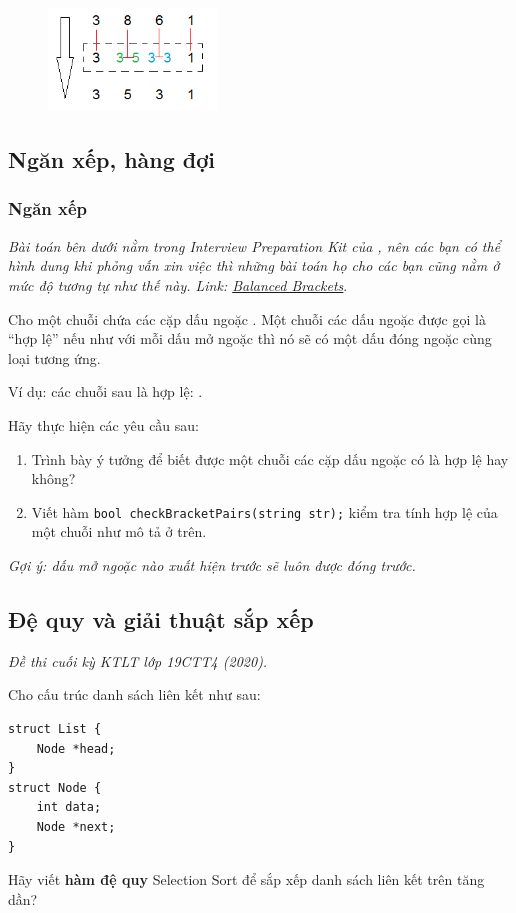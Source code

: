\documentclass[main.tex]{subfiles}
\begin{document}
\begin{figure}[H]
\centering
\includegraphics[width=0.4\textwidth]{image/q_DSLK.png}
\end{figure}
\subsection{Ngăn xếp, hàng đợi}
\subsubsection{Ngăn xếp}
\textit{Bài toán bên dưới nằm trong Interview Preparation Kit của , nên các bạn có thể hình dung khi phỏng vấn xin việc thì những bài toán họ cho các bạn cũng nằm ở mức độ tương tự như thế này. Link: \href{https://www.hackerrank.com/challenges/balanced-brackets/}{Balanced Brackets}}.

Cho một chuỗi chứa các cặp dấu ngoặc \code{() [] \{\}}. Một chuỗi các dấu ngoặc được gọi là ``hợp lệ'' nếu như với mỗi dấu mở ngoặc thì nó sẽ có một dấu đóng ngoặc cùng loại tương ứng.

Ví dụ: các chuỗi sau là hợp lệ: . 

Hãy thực hiện các yêu cầu sau:
\begin{enumerate}[label=\alph*.]
    \item Trình bày ý tưởng để biết được một chuỗi các cặp dấu ngoặc có là hợp lệ hay không?
    \item Viết hàm \texttt{bool checkBracketPairs(string str);} kiểm tra tính hợp lệ của một chuỗi như mô tả ở trên.
\end{enumerate}
\textit{Gợi ý: dấu mở ngoặc nào xuất hiện trước sẽ luôn được đóng trước.}

\subsection{Đệ quy và giải thuật sắp xếp}
\textit{Đề thi cuối kỳ KTLT lớp 19CTT4 (2020).}

Cho cấu trúc danh sách liên kết như sau:
\begin{verbatim}
struct List {
    Node *head;
}
struct Node {
    int data;
    Node *next;
}
\end{verbatim}
Hãy viết \textbf{hàm đệ quy} Selection Sort để sắp xếp danh sách liên kết trên tăng dần?
\end{document}
